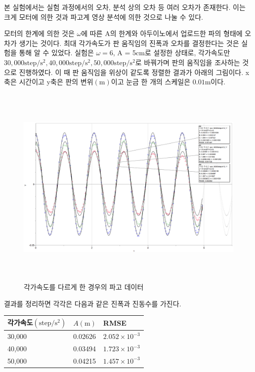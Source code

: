본 실험에서는 실험 과정에서의 오차, 분석 상의 오차 등 여러 오차가 존재한다. 이는 크게 모터에 의한 것과 파고계 영상 분석에 의한 것으로 나눌 수 있다.

모터의 한계에 의한 것은 $\omega$에 따른 A의 한계와 아두이노에서 업로드한 파의 형태에 오차가 생기는 것이다. 최대 각가속도가 판 움직임의 진폭과 오차를 결정한다는 것은 실험을 통해 알 수 있었다. 실험은 $\omega = 6$, A = 5cm로 설정한 상태로, 각가속도만 $30,000\mathrm{step/s^2}, 40,000\mathrm{step/s^2}, 50,000\mathrm{step/s^2}$로 바꿔가며 판의 움직임을 조사하는 것으로 진행하였다. 이 때 판 움직임을 위상이 같도록 정렬한 결과가 아래의 그림이다. x축은 시간이고 y축은 판의 변위$(\mathrm{m})$이고 눈금 한 개의 스케일은 $0.01\mathrm{m}$이다.

\begin{figure}[H]
    \centering
    \includegraphics[width = 15cm, height = 10cm]{images/singraphofdiffacc.png}
    \caption{각가속도를 다르게 한 경우의 파고 데이터}
    \label{fig:enter-label}
\end{figure}
결과를 정리하면 각각은 다음과 같은 진폭과 진동수를 가진다.


\begin{table}[H]
    \centering
    \begin{tabular}{l|ll}
    \hline
    각가속도$(\mathrm{step/s^{2}})$ & $A (\mathrm{m})$ & RMSE \\
    \hline
    30,000 & 0.02626 & $2.052\times10^{-3}$ \\
    40,000 & 0.03494 & $1.723\times10^{-3}$ \\
    50,000 & 0.04215 & $1.457\times10^{-3}$\\
    \hline
    \end{tabular}%
\end{table}


